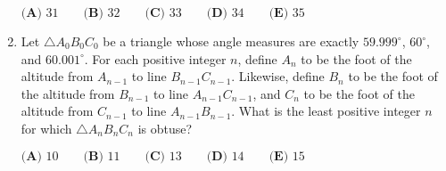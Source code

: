 \documentclass{article}
\begin{document}
\begin{enumerate}[label=\arabic*., itemsep=0.5em]
\(\textbf{(A) } 31 \qquad \textbf{(B) } 32 \qquad \textbf{(C) } 33 \qquad \textbf{(D) } 34 \qquad \textbf{(E) } 35\)\par \vspace{0.5em}\item Let \(\triangle A_0B_0C_0\) be a triangle whose angle measures are exactly \(59.999^\circ\), \(60^\circ\), and \(60.001^\circ\). For each positive integer \(n\), define \(A_n\) to be the foot of the altitude from \(A_{n-1}\) to line \(B_{n-1}C_{n-1}\). Likewise, define \(B_n\) to be the foot of the altitude from \(B_{n-1}\) to line \(A_{n-1}C_{n-1}\), and \(C_n\) to be the foot of the altitude from \(C_{n-1}\) to line \(A_{n-1}B_{n-1}\). What is the least positive integer \(n\) for which \(\triangle A_nB_nC_n\) is obtuse?

\(\textbf{(A) } 10 \qquad \textbf{(B) }11 \qquad \textbf{(C) } 13\qquad \textbf{(D) } 14 \qquad \textbf{(E) } 15\)\par \vspace{0.5em}
\end{enumerate}
\end{document}

